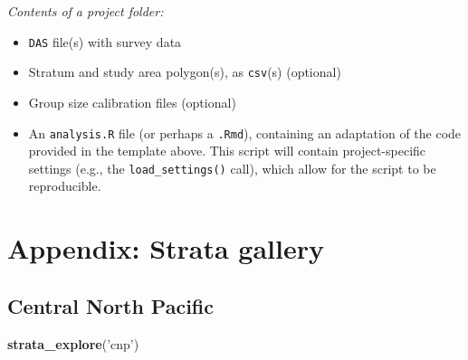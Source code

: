 \documentclass[
]{book}
\newenvironment{Shaded}{\begin{snugshade}}{\end{snugshade}}
\newcommand{\KeywordTok}[1]{\textcolor[rgb]{0.13,0.29,0.53}{\textbf{#1}}}
\newcommand{\NormalTok}[1]{#1}
\newcommand{\StringTok}[1]{\textcolor[rgb]{0.31,0.60,0.02}{#1}}
\providecommand{\tightlist}{%
  \setlength{\itemsep}{0pt}\setlength{\parskip}{0pt}}
\begin{document}
\emph{Contents of a project folder:}

\begin{itemize}
\tightlist
\item
  \texttt{DAS} file(s) with survey data\\
\item
  Stratum and study area polygon(s), as \texttt{csv}(s) (optional)\\
\item
  Group size calibration files (optional)\\
\item
  An \texttt{analysis.R} file (or perhaps a \texttt{.Rmd}), containing an adaptation of the code provided in the template above. This script will contain project-specific settings (e.g., the \texttt{load\_settings()} call), which allow for the script to be reproducible.
\end{itemize}

\hypertarget{stratagallery}{%
\chapter{Appendix: Strata gallery}\label{stratagallery}}

\hypertarget{central-north-pacific-1}{%
\section*{Central North Pacific}\label{central-north-pacific-1}}

\begin{Shaded}
\begin{Highlighting}[]
\KeywordTok{strata_explore}\NormalTok{(}\StringTok{'cnp'}\NormalTok{)}
\end{Highlighting}
\end{Shaded}
\end{document}
